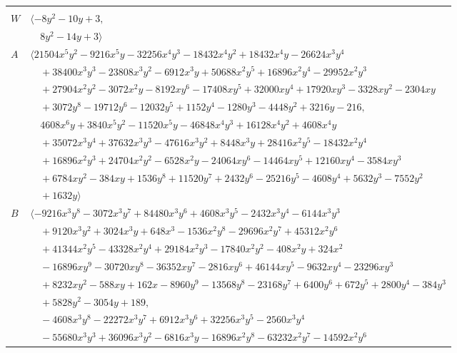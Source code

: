 \documentclass[11pt]{article}
\begin{document}
\begin{longtable}{@{}ll@{}}
\addlinespace[2pt]
\multicolumn{2}{@{}p{0.97\textwidth}@{}}{$i=10$, $D_i=8$, $\rho_{ij}$: $0{:}1, \allowbreak 21{:}2, \allowbreak 26{:}2, \allowbreak 31{:}2, \allowbreak 36{:}1, \allowbreak 37{:}2, \allowbreak 38{:}1$}\\
$W$ & $\langle -8y^{2}-10y+3,$\\
 & $\quad 8y^{2}-14y+3\rangle$\\
$A$ & $\langle 21504x^{5}y^{2}-9216x^{5}y-32256x^{4}y^{3}-18432x^{4}y^{2}+18432x^{4}y-26624x^{3}y^{4}$\\
 & $\quad +38400x^{3}y^{3}-23808x^{3}y^{2}-6912x^{3}y+50688x^{2}y^{5}+16896x^{2}y^{4}-29952x^{2}y^{3}$\\
 & $\quad +27904x^{2}y^{2}-3072x^{2}y-8192xy^{6}-17408xy^{5}+32000xy^{4}+17920xy^{3}-3328xy^{2}-2304xy$\\
 & $\quad +3072y^{8}-19712y^{6}-12032y^{5}+1152y^{4}-1280y^{3}-4448y^{2}+3216y-216,$\\
 & $\quad 4608x^{6}y+3840x^{5}y^{2}-11520x^{5}y-46848x^{4}y^{3}+16128x^{4}y^{2}+4608x^{4}y$\\
 & $\quad +35072x^{3}y^{4}+37632x^{3}y^{3}-47616x^{3}y^{2}+8448x^{3}y+28416x^{2}y^{5}-18432x^{2}y^{4}$\\
 & $\quad +16896x^{2}y^{3}+24704x^{2}y^{2}-6528x^{2}y-24064xy^{6}-14464xy^{5}+12160xy^{4}-3584xy^{3}$\\
 & $\quad +6784xy^{2}-384xy+1536y^{8}+11520y^{7}+2432y^{6}-25216y^{5}-4608y^{4}+5632y^{3}-7552y^{2}$\\
 & $\quad +1632y\rangle$\\
$B$ & $\langle -9216x^{3}y^{8}-3072x^{3}y^{7}+84480x^{3}y^{6}+4608x^{3}y^{5}-2432x^{3}y^{4}-6144x^{3}y^{3}$\\
 & $\quad +9120x^{3}y^{2}+3024x^{3}y+648x^{3}-1536x^{2}y^{8}-29696x^{2}y^{7}+45312x^{2}y^{6}$\\
 & $\quad +41344x^{2}y^{5}-43328x^{2}y^{4}+29184x^{2}y^{3}-17840x^{2}y^{2}-408x^{2}y+324x^{2}$\\
 & $\quad -16896xy^{9}-30720xy^{8}-36352xy^{7}-2816xy^{6}+46144xy^{5}-9632xy^{4}-23296xy^{3}$\\
 & $\quad +8232xy^{2}-588xy+162x-8960y^{9}-13568y^{8}-23168y^{7}+6400y^{6}+672y^{5}+2800y^{4}-384y^{3}$\\
 & $\quad +5828y^{2}-3054y+189,$\\
 & $\quad -4608x^{3}y^{8}-22272x^{3}y^{7}+6912x^{3}y^{6}+32256x^{3}y^{5}-2560x^{3}y^{4}$\\
 & $\quad -55680x^{3}y^{3}+36096x^{3}y^{2}-6816x^{3}y-16896x^{2}y^{8}-63232x^{2}y^{7}-14592x^{2}y^{6}$\\

\end{longtable}
\end{document}
